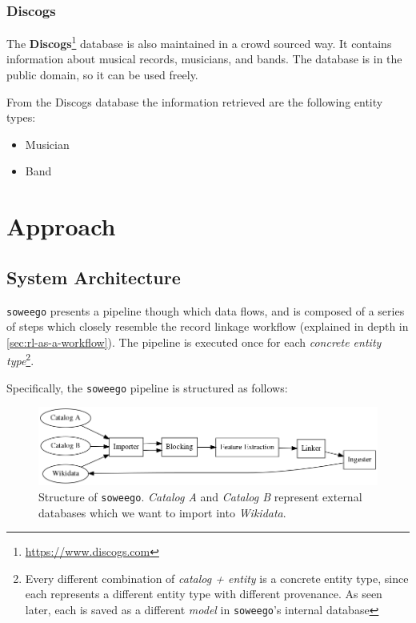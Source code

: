 \documentclass[epsfig,a4paper,11pt,titlepage,twoside,openany]{book}
\newcommand{\footurl}[1]{\footnote{\url{#1}}}
\begin{document}
\subsection{Discogs}
\label{sec:catalog-discogs}


The \textbf{Discogs}\footurl{https://www.discogs.com} database is also maintained in a crowd sourced way. It contains information about musical records, musicians, and bands. The database is in the public domain, so it can be used freely.

From the Discogs database the information retrieved are the following entity types:

\begin{itemize}
\item Musician
\item Band
\end{itemize}


\chapter{Approach}
\label{chap:apprach}


\section{System Architecture}
\label{sec:system-architecture}


\texttt{soweego} presents a pipeline though which data flows, and is composed of a series of steps which closely resemble the record linkage workflow (explained in depth in \autoref{sec:rl-as-a-workflow}). The pipeline is executed once for each  \textit{concrete entity type}\footnote{Every different combination of \textit{catalog + entity}  is a concrete entity type, since each represents a different entity type with different provenance. As seen later, each is saved as a different \textit{model} in \texttt{soweego}'s internal database}.

Specifically, the \texttt{soweego} pipeline is structured as follows:

\begin{figure}[H]
  \centering \includegraphics[width=\textwidth]{soweego_structure}
  \caption{Structure of \texttt{soweego}. \textit{Catalog A} and \textit{Catalog
      B} represent external databases which we want to import into
    \textit{Wikidata}.}
  \label{fig:soweego-structure}
\end{figure}
\end{document}
